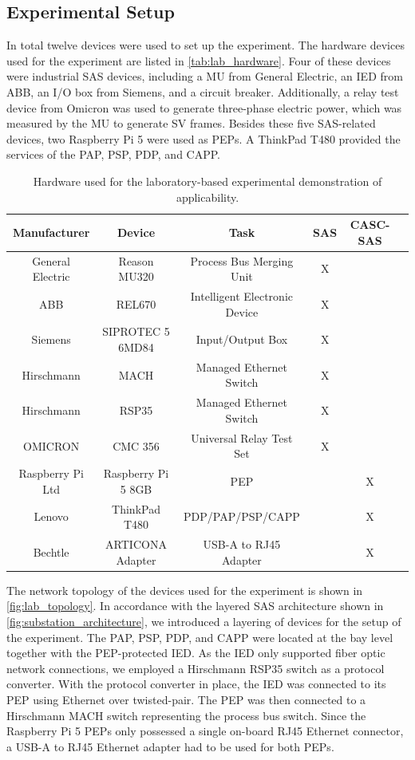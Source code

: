 \subsection{Experimental Setup}
\label{sec:evaluation:compatibility:setup}
In total twelve devices were used to set up the experiment.
The hardware devices used for the experiment are listed in \autoref{tab:lab_hardware}.
Four of these devices were industrial SAS devices, including a MU from General Electric, an IED from ABB, an I/O box from Siemens, and a circuit breaker.
Additionally, a relay test device from Omicron was used to generate three-phase electric power, which was measured by the MU to generate SV frames.
Besides these five SAS-related devices, two Raspberry Pi 5 were used as PEPs.
A ThinkPad T480 provided the services of the PAP, PSP, PDP, and CAPP.
\begin{table}
    \centering
    \small
    \caption{Hardware used for the laboratory-based experimental demonstration of applicability.}
    \label{tab:lab_hardware}
    \begin{tabular}{c c c c c c}
    \toprule
    Manufacturer & Device & Task & SAS & CASC-SAS\\
    \midrule
    General Electric & Reason MU320 & Process Bus Merging Unit & X & & \\
    ABB & REL670 & Intelligent Electronic Device & X & \\
    Siemens & SIPROTEC 5 6MD84 & Input/Output Box & X & \\
    Hirschmann & MACH & Managed Ethernet Switch & X & \\
    Hirschmann & RSP35 & Managed Ethernet Switch & X & \\
    OMICRON & CMC 356 & Universal Relay Test Set & X & \\
    Raspberry Pi Ltd & Raspberry Pi 5 8GB & PEP & & X \\
    Lenovo & ThinkPad T480 & PDP/PAP/PSP/CAPP & & X \\
    Bechtle & ARTICONA Adapter & USB-A to RJ45 Adapter & & X \\
    \bottomrule
    \end{tabular}
\end{table}

The network topology of the devices used for the experiment is shown in \autoref{fig:lab_topology}.
In accordance with the layered SAS architecture shown in \autoref{fig:substation_architecture}, we introduced a layering of devices for the setup of the experiment.
The PAP, PSP, PDP, and CAPP were located at the bay level together with the PEP-protected IED.
As the IED only supported fiber optic network connections, we employed a Hirschmann RSP35 switch as a protocol converter.
With the protocol converter in place, the IED was connected to its PEP using Ethernet over twisted-pair.
The PEP was then connected to a Hirschmann MACH switch representing the process bus switch.
Since the Raspberry Pi 5 PEPs only possessed a single on-board RJ45 Ethernet connector, a USB-A to RJ45 Ethernet adapter had to be used for both PEPs.

